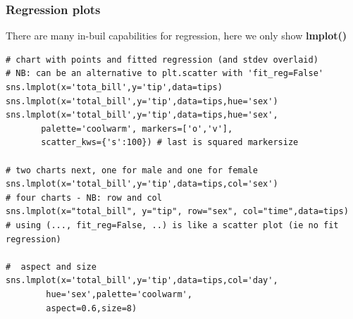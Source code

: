 \documentclass[12pt]{article}
\begin{document}
\subsubsection{Regression plots}
There are many in-buil capabilities for regression, here we only show \textbf{lmplot()}
\begin{lstlisting}
# chart with points and fitted regression (and stdev overlaid)
# NB: can be an alternative to plt.scatter with 'fit_reg=False'
sns.lmplot(x='tota_bill',y='tip',data=tips)
sns.lmplot(x='total_bill',y='tip',data=tips,hue='sex')
sns.lmplot(x='total_bill',y='tip',data=tips,hue='sex',
       palette='coolwarm', markers=['o','v'],
       scatter_kws={'s':100}) # last is squared markersize

# two charts next, one for male and one for female
sns.lmplot(x='total_bill',y='tip',data=tips,col='sex')
# four charts - NB: row and col
sns.lmplot(x="total_bill", y="tip", row="sex", col="time",data=tips)
# using (..., fit_reg=False, ..) is like a scatter plot (ie no fit regression)

#  aspect and size
sns.lmplot(x='total_bill',y='tip',data=tips,col='day',
		hue='sex',palette='coolwarm',
        aspect=0.6,size=8)
\end{lstlisting}

\end{document}
